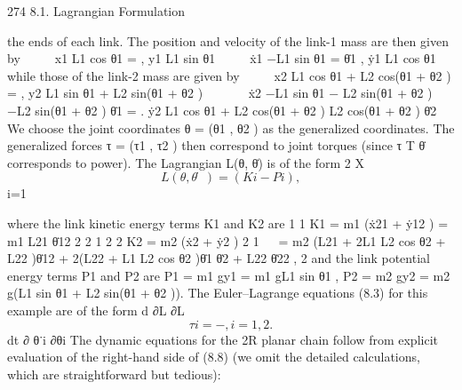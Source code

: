 \documentclass[12pt,a4paper]{article}
\begin{document}
274                                                                 8.1. Lagrangian Formulation

the ends of each link. The position and velocity of the link-1 mass are then
given by
                                             
                         x1           L1 cos θ1
                               =                  ,
                         y1           L1 sin θ1
                                               
                         ẋ1          −L1 sin θ1
                               =                    θ̇1 ,
                         ẏ1           L1 cos θ1
while those of the link-2 mass are given by
                                              
      x2            L1 cos θ1 + L2 cos(θ1 + θ2 )
             =                                     ,
      y2            L1 sin θ1 + L2 sin(θ1 + θ2 )
                                                                        
      ẋ2           −L1 sin θ1 − L2 sin(θ1 + θ2 ) −L2 sin(θ1 + θ2 )      θ̇1
             =                                                                 .
      ẏ2            L1 cos θ1 + L2 cos(θ1 + θ2 )    L2 cos(θ1 + θ2 )    θ̇2
We choose the joint coordinates θ = (θ1 , θ2 ) as the generalized coordinates.
The generalized forces τ = (τ1 , τ2 ) then correspond to joint torques (since τ T θ̇
corresponds to power). The Lagrangian L(θ, θ̇) is of the form
                                                  2
                                                  X
\begin{equation}
L(θ, θ̇) =     (Ki − Pi ),
\label{eq:8.7}
\end{equation}
                                                  i=1

where the link kinetic energy terms K1 and K2 are
            1                    1
K1    =       m1 (ẋ21 + ẏ12 ) = m1 L21 θ̇12
            2                    2
            1        2      2
K2    =       m2 (ẋ2 + ẏ2 )
            2
            1                                                                              
      =       m2 (L21 + 2L1 L2 cos θ2 + L22 )θ̇12 + 2(L22 + L1 L2 cos θ2 )θ̇1 θ̇2 + L22 θ̇22 ,
            2
and the link potential energy terms P1 and P2 are
                   P1    = m1 gy1 = m1 gL1 sin θ1 ,
                   P2    = m2 gy2 = m2 g(L1 sin θ1 + L2 sin(θ1 + θ2 )).
The Euler–Lagrange equations (8.3) for this example are of the form
                                      d ∂L       ∂L
\begin{equation}
τi =            −     ,        i = 1, 2.
\label{eq:8.8}
\end{equation}
                                      dt ∂ θ˙i   ∂θi
The dynamic equations for the 2R planar chain follow from explicit evaluation
of the right-hand side of (8.8) (we omit the detailed calculations, which are
straightforward but tedious):
\end{document}
